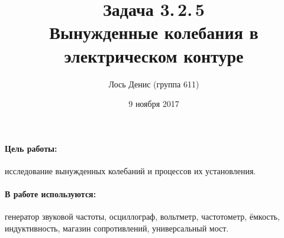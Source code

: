 \documentclass[12pt]{article}
\title{{\bf Задача 3.\,2.\,5 \\ Вынужденные колебания в электрическом контуре}}
\author{Лось Денис (группа 611)}
\date{9 ноября 2017}
\begin{document}
\maketitle

\paragraph{Цель работы:} исследование вынужденных колебаний и процессов их установления.

\paragraph{В работе используются: } генератор звуковой частоты, осциллограф, вольтметр, частотометр, ёмкость, индуктивность, магазин сопротивлений, универсальный мост.
\end{document}
